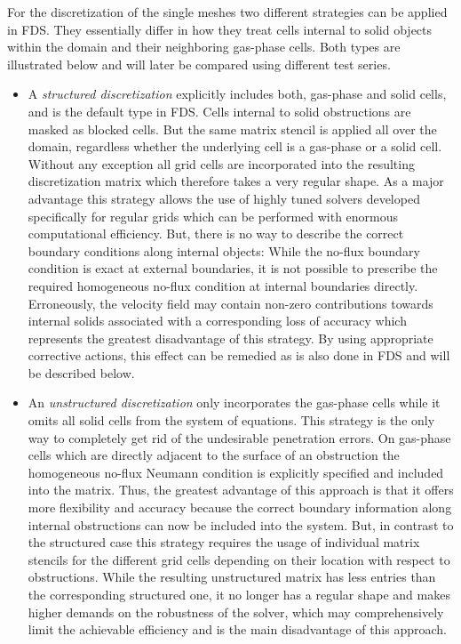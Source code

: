 For the discretization of the single meshes two different strategies can be applied in FDS. They essentially differ in how they treat cells internal to solid objects within the domain and their neighboring gas-phase cells. Both types are illustrated below and will later be compared using different test series.
\begin{itemize}
\item A {\it structured discretization} explicitly includes both, gas-phase and solid cells,
and is the default type in FDS. Cells internal to solid obstructions are masked as blocked cells. But the same matrix stencil is applied all over the domain, regardless whether the underlying cell is a gas-phase or a solid cell. Without any exception all grid cells are incorporated into the resulting discretization matrix which therefore takes a very regular shape. As a major advantage this strategy allows the use of highly tuned solvers developed specifically for regular grids which can be performed with enormous computational efficiency. But, there is no way to describe the correct boundary conditions along internal objects:
While the no-flux boundary condition is exact at external boundaries, it is not possible to prescribe the required homogeneous no-flux condition at internal boundaries directly. Erroneously, 
the velocity field may contain non-zero contributions towards internal solids
associated with a corresponding loss of accuracy which represents the greatest disadvantage of this strategy. By using appropriate corrective actions, this effect can be remedied as is also done in FDS and will be described below.

\item An {\it unstructured discretization} only incorporates the gas-phase cells while it omits all solid cells from the system of equations. This strategy is the only way to completely get rid of the undesirable penetration errors. On gas-phase cells which are directly adjacent to the surface of an obstruction the homogeneous no-flux Neumann condition is explicitly specified and included into the matrix. Thus, the greatest advantage of this approach is that it offers more flexibility and accuracy because the correct boundary information along  internal obstructions can now be included into the system. But, in contrast to the structured case this strategy requires the usage of individual matrix stencils for the different grid cells depending on their location with respect to obstructions. While the resulting unstructured matrix has less entries than the corresponding structured one, it no longer has a regular shape and makes higher demands on the robustness of the solver, which may comprehensively limit the achievable efficiency and is the main disadvantage of this approach. 
\end{itemize}

